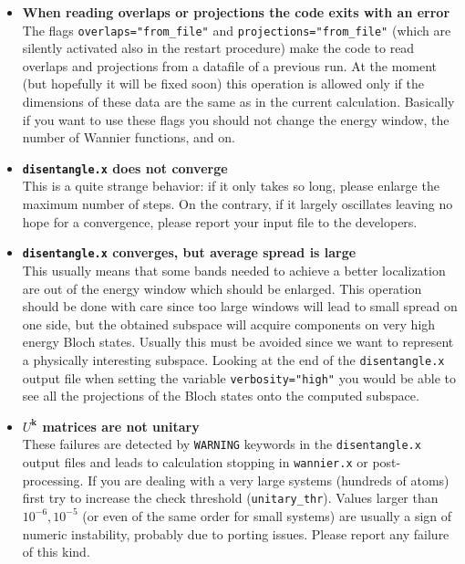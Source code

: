 \begin{itemize}
\item   {\bf When reading overlaps or projections the code exits with an error } \\
        The flags {\tt overlaps="from\_file"} and {\tt projections="from\_file"}
        (which are silently activated also in the restart procedure) make the
        code to read overlaps and projections from a datafile of a previous run.
        At the moment (but hopefully it will be fixed soon)
        this operation is allowed only if the dimensions of these data are the
        same as in the current calculation. Basically if you want to use these flags
        you should not change the energy window, the number of Wannier functions, and
        on.

\item   {\bf {\tt disentangle.x} does not converge } \\
        This is a quite strange behavior: if it only takes so long, please enlarge
        the maximum number of steps. On the contrary, if it largely oscillates
        leaving no hope for a convergence, please report your input file to the
        developers.

\item   {\bf {\tt disentangle.x} converges, but average spread is large } \\
        This usually means that some bands needed to achieve a better localization
        are out of the energy window which should be enlarged. This operation should
        be done with care since too large windows will lead to small spread on one
        side, but the obtained subspace will acquire components on very high energy
        Bloch states. Usually this must be avoided since we want to represent
        a physically interesting subspace.
        Looking at the end of the {\tt disentangle.x} output file when setting the
        variable {\tt verbosity="high"} you would be able to see all the projections
        of the Bloch states onto the computed subspace.

\item   {\bf $U^{\mathbf{k}}$ matrices are not unitary } \\
        These failures are detected by {\tt WARNING} keywords in the {\tt disentangle.x}
        output files and leads to calculation stopping in {\tt wannier.x} or
        post-processing. If you are dealing with a very large systems
        (hundreds of atoms) first try to increase the check threshold ({\tt unitary\_thr}).
        Values larger than $10^{-6}, 10^{-5}$ (or even of the same order for small systems)
        are usually a sign of numeric instability, probably due to porting issues.
        Please report any failure of this kind.


\end{itemize}
